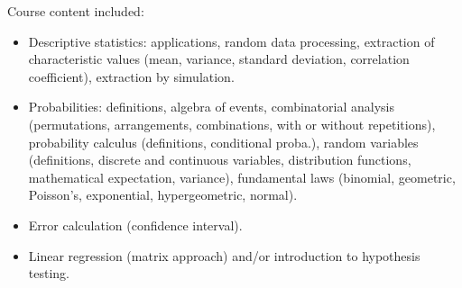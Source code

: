 Course content included:
\begin{itemize}
    \item Descriptive statistics: applications, random data processing, extraction of characteristic values (mean, variance, standard deviation, correlation coefficient), extraction by simulation.
    \item Probabilities: definitions, algebra of events, combinatorial analysis (permutations, arrangements, combinations, with or without repetitions), probability calculus (definitions, conditional proba.), random variables (definitions, discrete and continuous variables, distribution functions, mathematical expectation, variance), fundamental laws (binomial, geometric, Poisson's, exponential, hypergeometric, normal).
    \item Error calculation (confidence interval).
    \item Linear regression (matrix approach) and/or introduction to hypothesis testing.
\end{itemize}